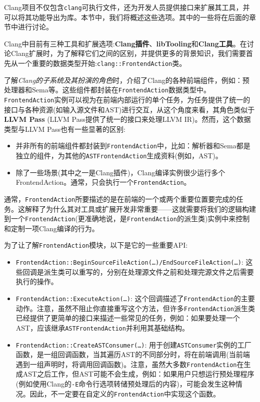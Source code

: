 
Clang项目不仅包含\texttt{clang}可执行文件，还为开发人员提供接口来扩展其工具，并可以将其功能导出为库。本节中，我们将概述这些选项。其中的一些将在后面的章节中进行讨论。

Clang中目前有三种工具和扩展选项:\textbf{Clang插件}、\textbf{libTooling}和\textbf{Clang工具}。在讨论Clang扩展时，为了解释它们之间的区别，并提供更多的背景知识，我们需要首先从一个重要的数据类型开始:\texttt{clang::FrontendAction}类。


了解\textit{Clang的子系统及其扮演的角色}时，介绍了Clang的各种前端组件，例如：预处理器和Sema等。这些组件都封装在\texttt{FrontendAction}数据类型中。\texttt{FrontendAction}实例可以视为在前端内部运行的单个任务，为任务提供了统一的接口与各种资源(如输入源文件和AST)进行交互，从这个角度来看，其角色类似于\textbf{LLVM Pass} (LLVM Pass提供了统一的接口来处理LLVM IR)。然而，这个数据类型与LLVM Pass也有一些显著的区别:

\begin{itemize}
\item 并非所有的前端组件都封装到\texttt{FrontendAction}中，比如：解析器和Sema都是独立的组件，为其他的\texttt{ASTFrontendAction}生成资料(例如，AST)。

\item 除了一些场景(其中之一是Clang插件)，Clang编译实例很少运行多个FrontendAction。通常，只会执行一个\texttt{FrontendAction}。
\end{itemize}

通常，\texttt{FrontendAction}所要描述的是在前端的一个或两个重要位置要完成的任务。这解释了为什么其对工具或扩展开发非常重要——这就需要将我们的逻辑构建到一个\texttt{FrontendAction}(更准确地说，是\texttt{FrontendAction}的派生类)实例中来控制和定制一项Clang编译的行为。

为了让了解\texttt{FrontendAction}模块，以下是它的一些重要API:

\begin{itemize}
\item \texttt{FrontendAction::BeginSourceFileAction(…)/EndSourceFileAction(…)}: 这些回调是派生类可以重写的，分别在处理源文件之前和处理完源文件之后需要执行的操作。 

\item \texttt{FrontendAction::ExecuteAction(…)}: 这个回调描述了\texttt{FrontendAction}的主要动作。注意，虽然不阻止你直接重写这个方法，但许多\texttt{FrontendAction}派生类已经提供了更简单的接口来描述一些常见的任务，例如：如果要处理一个AST，应该继承\texttt{ASTFrontendAction}并利用其基础结构。

\item \texttt{FrontendAction::CreateASTConsumer(…)}: 用于创建\texttt{ASTConsumer}实例的工厂函数，是一组回调函数，当其遍历AST的不同部分时，将在前端调用(当前端遇到一组声明时，将调用回调函数)。注意，虽然大多数\texttt{FrontendAction}在生成AST之后工作，但AST可能不会生成，例如：如果用户只想运行预处理程序(例如使用Clang的\texttt{-E}命令行选项转储预处理后的内容)，可能会发生这种情况。因此，不一定要在自定义的\texttt{FrontendAction}中实现这个函数。
\end{itemize}

